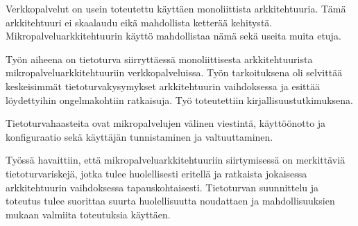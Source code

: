 
\begin{fiabstract}
    \begin{sloppypar}
        Verkkopalvelut on usein toteutettu käyttäen monoliittista
        arkkitehtuuria. Tämä arkkitehtuuri ei skaalaudu eikä mahdollista
        ketterää kehitystä. Mikropalveluarkkitehtuurin käyttö mahdollistaa nämä
        sekä useita muita etuja.
    \end{sloppypar}
    \begin{sloppypar}    
        Työn aiheena on tietoturva siirryttäessä monoliittisesta
        arkkitehtuurista mikropalveluarkkitehtuuriin verkkopalveluissa. Työn
        tarkoituksena oli selvittää keskeisimmät tietoturvakysymykset
        arkkitehtuurin vaihdoksessa ja esittää löydettyihin ongelmakohtiin
        ratkaisuja. Työ toteutettiin kirjallisuustutkimuksena.
    \end{sloppypar}
    \begin{sloppypar}        
        Tietoturvahaasteita ovat mikropalvelujen välinen viestintä, käyttöönotto
        ja konfiguraatio sekä käyttäjän tunnistaminen ja valtuuttaminen.
    \end{sloppypar}
    \begin{sloppypar}
        Työssä havaittiin, että mikropalveluarkkitehtuuriin siirtymisessä on
        merkittäviä tietoturvariskejä, jotka tulee huolellisesti eritellä ja
        ratkaista jokaisessa arkkitehtuurin vaihdoksessa tapauskohtaisesti.
        Tietoturvan suunnittelu ja toteutus tulee suorittaa suurta
        huolellisuutta noudattaen ja mahdollisuuksien mukaan valmiita
        toteutuksia käyttäen.
    \end{sloppypar}
\end{fiabstract}

